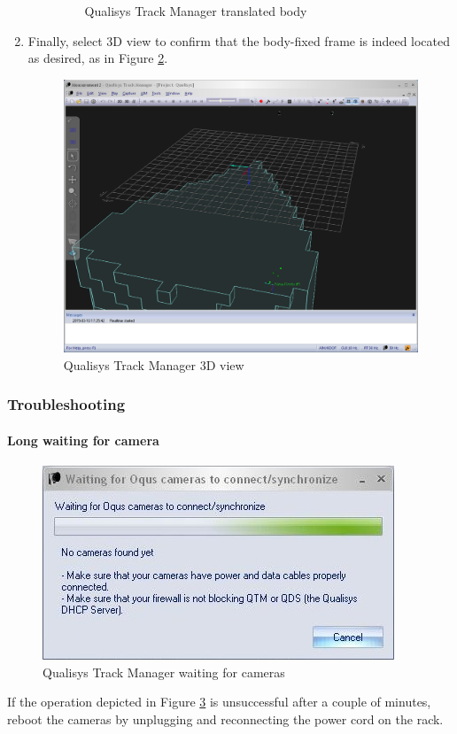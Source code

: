 \documentclass[a4paper,english]{report}
\begin{document}
\begin{enumerate}
\begin{enumerate}
\begin{figure}[!h]
			\caption{\label{fig:Qualisys-Track-Managertranslated}Qualisys Track Manager translated body}
		\end{figure}
	\end{enumerate}
	\item Finally, select 3D view to confirm that the body-fixed frame is indeed located as desired, as in Figure \ref{fig:Qualisys-Track-Managerr3D}.
	\begin{figure}[!h]
		\centering \includegraphics[width=1\textwidth]{fig/qualisys_3d} \caption{\label{fig:Qualisys-Track-Managerr3D}Qualisys Track Manager 3D view}
	\end{figure}
\end{enumerate}

\subsubsection*{Troubleshooting}
\paragraph*{Long waiting for camera}
\begin{figure}[!h]
	\centering 
	\includegraphics[scale=0.45]{fig/qualisys_waiting_to_connect}
	\caption{Qualisys Track Manager waiting for cameras}
	\label{fig:Qualisys-Track-ManagerWaiting}
\end{figure}
If the operation depicted in Figure \ref{fig:Qualisys-Track-ManagerWaiting} is unsuccessful after a couple of minutes, reboot the cameras by unplugging and reconnecting the power cord on the rack.
\clearpage{}
\end{document}
